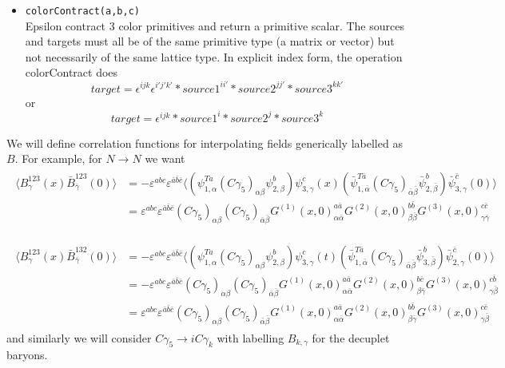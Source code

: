 \documentclass[12pt]{article}
\begin{document}
\begin{itemize}
\item
\verb|colorContract(a,b,c)|\\
Epsilon contract 3 color primitives and return a primitive scalar.
The sources and targets must all be of the same primitive type (a matrix or vector)
but not necessarily of the same lattice type. In
explicit index form, the operation  colorContract does
\[
target =
  \epsilon^{i j k}\epsilon^{i' j' k'}* source1^{i i'}* source2^{j j'}*source3^{k k'}
\]
or
\[
target =
 \epsilon^{i j k}* source1^{i}* source2^{j}*source3^{k}
\]

\end{itemize}

We will define correlation functions for interpolating fields generically
labelled as $B$. For example, for $N\rightarrow N$ we want
\begin{gather*}
\begin{split}
\langle B^{123}_\gamma(x) \bar{B}^{123}_{\bar\gamma}(0)\rangle
 &= -\varepsilon^{abc}\varepsilon^{\bar{a}\bar{b}\bar{c}} \langle
  \left(\psi^{T a}_{1,\alpha}(C\gamma_5)_{\alpha\beta}\psi^b_{2,\beta}\right)
        \psi^c_{3,\gamma}(x)
  \left(\bar\psi^{T\bar{a}}_{1,\bar\alpha}(C\gamma_5)_{\bar{\alpha}\bar{\beta}}\bar{\psi}^b_{2,\bar\beta}\right)
        \bar{\psi}^{\bar{c}}_{3,\gamma}(0)
  \rangle \\
 &= \varepsilon^{abc}\varepsilon^{\bar{a}\bar{b}\bar{c}} 
    (C\gamma_5)_{\alpha\beta} (C\gamma_5)_{\bar{\alpha}\bar{\beta}}
    G^{(1)}(x,0)^{a\bar{a}}_{\alpha\bar{\alpha}}
    G^{(2)}(x,0)^{b\bar{b}}_{\beta\bar{\beta}}
    G^{(3)}(x,0)^{c\bar{c}}_{\gamma\bar{\gamma}}
\end{split}
\end{gather*}

\begin{gather*}
\begin{split}
\langle B^{123}_\gamma(x) \bar{B}^{132}_{\bar\gamma}(0)\rangle
 &= -\varepsilon^{abc}\varepsilon^{\bar{a}\bar{b}\bar{c}} \langle
  \left(\psi^{T a}_{1,\alpha}(C\gamma_5)_{\alpha\beta}\psi^b_{2,\beta}\right)
        \psi^c_{3,\gamma}(t)
  \left(\bar\psi^{T\bar{a}}_{1,\bar\alpha}(C\gamma_5)_{\bar{\alpha}\bar{\beta}}\bar{\psi}^b_{3,\bar\beta}\right)
        \bar{\psi}^{\bar{c}}_{2,\gamma}(0)
  \rangle \\
 &=-\varepsilon^{abc}\varepsilon^{\bar{a}\bar{b}\bar{c}} 
    (C\gamma_5)_{\alpha\beta} (C\gamma_5)_{\bar{\alpha}\bar{\beta}}
    G^{(1)}(x,0)^{a\bar{a}}_{\alpha\bar{\alpha}}
    G^{(2)}(x,0)^{b\bar{c}}_{\beta\bar{\gamma}}
    G^{(3)}(x,0)^{c\bar{b}}_{\gamma\bar{\beta}} \\
 &= \varepsilon^{abc}\varepsilon^{\bar{a}\bar{b}\bar{c}} 
    (C\gamma_5)_{\alpha\beta} (C\gamma_5)_{\bar{\alpha}\bar{\beta}}
    G^{(1)}(x,0)^{a\bar{a}}_{\alpha\bar{\alpha}}
    G^{(2)}(x,0)^{b\bar{b}}_{\beta\bar{\gamma}}
    G^{(3)}(x,0)^{c\bar{c}}_{\gamma\bar{\beta}}
\end{split}
\end{gather*}
and similarly we will consider $C\gamma_5\rightarrow iC\gamma_k$ with labelling
$B_{k,\gamma}$ for the decuplet baryons.
\end{document}
